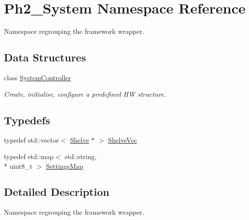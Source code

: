 \hypertarget{namespace_ph2___system}{\section{Ph2\-\_\-\-System Namespace Reference}
\label{namespace_ph2___system}
}


Namespace regrouping the framework wrapper.  


\subsection*{Data Structures}
\begin{DoxyCompactItemize}
\item 
class \hyperlink{class_ph2___system_1_1_system_controller}{System\-Controller}
\begin{DoxyCompactList}\small\item\em Create, initialise, configure a predefined H\-W structure. \end{DoxyCompactList}\end{DoxyCompactItemize}
\subsection*{Typedefs}
\begin{DoxyCompactItemize}
\item 
typedef std\-::vector$<$ \hyperlink{class_ph2___hw_description_1_1_shelve}{Shelve} $\ast$ $>$ \hyperlink{namespace_ph2___system_a1c21eed494ab8a888694adf3de379dcf}{Shelve\-Vec}
\item 
typedef std\-::map$<$ std\-::string, \\*
uint8\-\_\-t $>$ \hyperlink{namespace_ph2___system_a0ea674c0ee02ac6834ac9a1335111980}{Settings\-Map}
\end{DoxyCompactItemize}


\subsection{Detailed Description}
Namespace regrouping the framework wrapper. 

